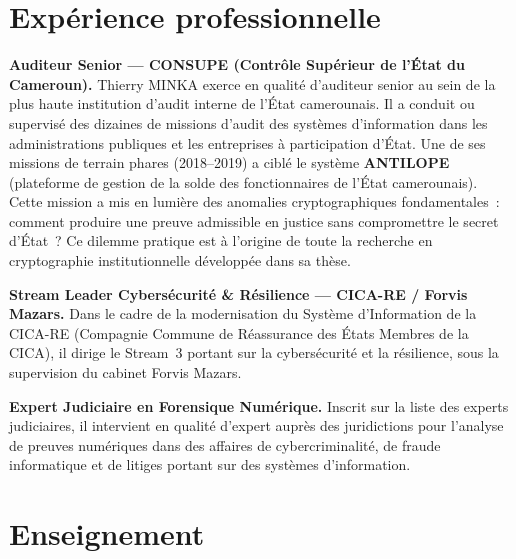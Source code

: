 \section*{Expérience professionnelle}

\textbf{Auditeur Senior — CONSUPE (Contrôle Supérieur de l'État du Cameroun).}
Thierry MINKA exerce en qualité d'auditeur senior au sein de la plus haute
institution d'audit interne de l'État camerounais. Il a conduit ou supervisé
des dizaines de missions d'audit des systèmes d'information dans les
administrations publiques et les entreprises à participation d'État.
Une de ses missions de terrain phares (2018--2019) a ciblé le système
\textbf{ANTILOPE} (plateforme de gestion de la solde des fonctionnaires
de l'État camerounais). Cette mission a mis en lumière des anomalies
cryptographiques fondamentales~: comment produire une preuve admissible
en justice sans compromettre le secret d'État~? Ce dilemme pratique
est à l'origine de toute la recherche en cryptographie institutionnelle
développée dans sa thèse.

\textbf{Stream Leader Cybersécurité \& Résilience — CICA-RE / Forvis Mazars.}
Dans le cadre de la modernisation du Système d'Information de la CICA-RE
(Compagnie Commune de Réassurance des États Membres de la CICA), il dirige
le Stream~3 portant sur la cybersécurité et la résilience, sous la supervision
du cabinet Forvis Mazars.

\textbf{Expert Judiciaire en Forensique Numérique.}
Inscrit sur la liste des experts judiciaires, il intervient en qualité
d'expert auprès des juridictions pour l'analyse de preuves numériques dans
des affaires de cybercriminalité, de fraude informatique et de litiges
portant sur des systèmes d'information.

\section*{Enseignement}

